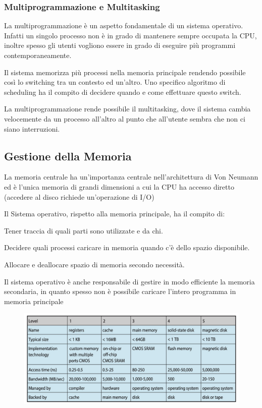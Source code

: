 \subsubsection{Multiprogrammazione e Multitasking}
La multiprogrammazione è un aspetto fondamentale di un sistema operativo. Infatti un singolo processo non è in grado di mantenere sempre occupata la CPU, inoltre spesso gli utenti vogliono essere in grado di eseguire più programmi contemporaneamente.

\spacer
Il sistema memorizza più processi nella memoria principale rendendo possibile così lo switching tra un contesto ed un'altro. Uno specifico algoritmo di scheduling ha il compito di decidere quando e come effettuare questo switch.

\spacer
La multiprogrammazione rende possibile il multitasking, dove il sistema cambia velocemente da un processo all'altro al punto che all'utente sembra che non ci siano interruzioni.

\subsection{Gestione della Memoria}
La memoria centrale ha un'importanza centrale nell'architettura di Von Neumann ed è l'unica memoria di grandi dimensioni a cui la CPU ha accesso diretto (accedere al disco richiede un'operazione di I/O)

\spacer
Il Sistema operativo, rispetto alla memoria principale, ha il compito di:
\begin{sitemize}
    \item Tener traccia di quali parti sono utilizzate e da chi.
    \item Decidere quali processi caricare in memoria quando c'è dello spazio disponibile.
    \item Allocare e deallocare spazio di memoria secondo necessità.
\end{sitemize}

\spacer
Il sistema operativo è anche responsabile di gestire in modo efficiente la memoria secondaria, in quanto spesso non è possibile caricare l'intero programma in memoria principale

\begin{figure}[H]
    \centering
    \includegraphics[width=0.75\linewidth]{assets/memory-size.jpg}
\end{figure}

